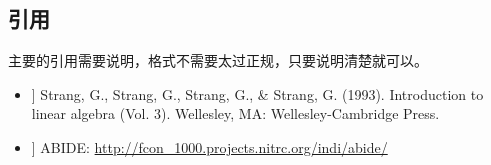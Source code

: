 \documentclass[a4paper,9pt]{extarticle}
\begin{document}
\begin{multicols*}{2}
\section*{引用}
    主要的引用需要说明，格式不需要太过正规，只要说明清楚就可以。
    \begin{itemize}
        \item [[1]] Strang, G., Strang, G., Strang, G., \& Strang, G. (1993). Introduction to linear algebra (Vol. 3). Wellesley, MA: Wellesley-Cambridge Press.
        
        \item [[2]] ABIDE: \url{http://fcon_1000.projects.nitrc.org/indi/abide/}
    \end{itemize}

\end{multicols*}
\end{document}
